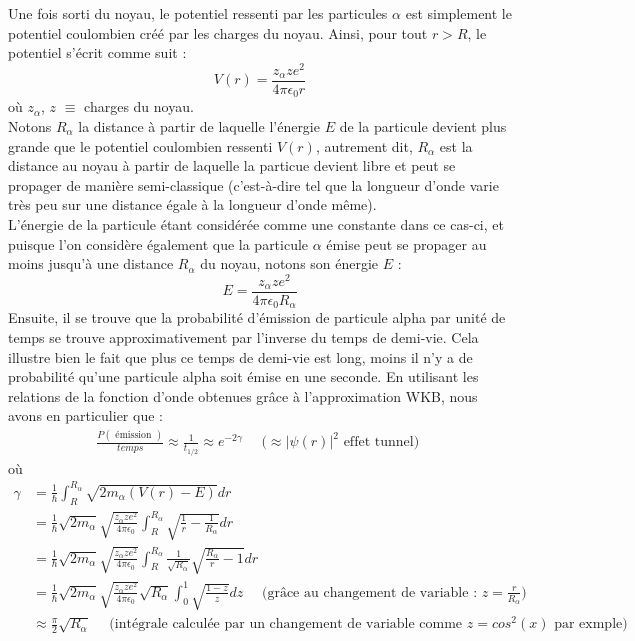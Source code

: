 \documentclass[12pt, a4paper]{book}
\begin{document}
Une fois sorti du noyau, le potentiel ressenti par les particules $\alpha$ est simplement le potentiel coulombien créé par les charges du noyau. Ainsi, pour tout $r > R$, le potentiel s'écrit comme suit :
\begin{equation}
  V(r) = \frac{z_{\alpha} z e^2}{4 \pi \epsilon_0 r} %
\end{equation}
où $z_{\alpha}$, $z$ $\equiv$ charges du noyau. \\

Notons $R_{\alpha}$ la distance à partir de laquelle l'énergie $E$ de la particule devient plus grande que le potentiel coulombien ressenti $V(r)$, autrement dit, $R_{\alpha}$ est la distance au noyau à partir de laquelle la particue devient libre et peut se propager de manière semi-classique (c'est-à-dire tel que la longueur d'onde varie très peu sur une distance égale à la longueur d'onde même). \\
L'énergie de la particule étant considérée comme une constante dans ce cas-ci, et puisque l'on considère également que la particule $\alpha$ émise peut se propager au moins jusqu'à une distance $R_{\alpha}$ du noyau, notons son énergie $E$ : $$ E= \frac{z_{\alpha}z e^2}{4 \pi \epsilon_0 R_{\alpha}}$$ 
Ensuite, il se trouve que la probabilité d'émission de particule alpha par unité de temps se trouve approximativement par l'inverse du temps de demi-vie. Cela illustre bien le fait que plus ce temps de demi-vie est long, moins il n'y a de probabilité qu'une particule alpha soit émise en une seconde. En utilisant les relations de la fonction d'onde obtenues grâce à l'approximation WKB,
nous avons en particulier que : 
\begin{align}
  \frac{P( \mbox{ émission } )}{temps} \approx \frac{1}{t_{1/2}} \approx e^{-2 \gamma} \quad \mbox{ ($\approx \lvert \psi (r) \rvert ^2$ effet tunnel) } 
\end{align}
où  \begin{align*}
  \gamma &= \frac{1}{\hbar} \int_R^{R_{\alpha}} \sqrt{2 m_{\alpha} (V(r) - E)} dr \\
  &= \frac{1}{\hbar} \sqrt{2 m_{\alpha}} \sqrt{\frac{z_{\alpha} z e^2}{4 \pi \epsilon_0}} \int_R^{R_{\alpha}} \sqrt{\frac{1}{r} - \frac{1}{R_{\alpha}}} dr \\
  &= \frac{1}{\hbar} \sqrt{2 m_{\alpha}} \sqrt{\frac{z_{\alpha} z e^2}{4 \pi \epsilon_0}} \int_R^{R_{\alpha}} \frac{1}{\sqrt{R_{\alpha}}} \sqrt{\frac{R_{\alpha}}{r} - 1} dr \\
  &= \frac{1}{\hbar} \sqrt{2 m_{\alpha}} \sqrt{\frac{z_{\alpha} z e^2}{4 \pi \epsilon_0}} \sqrt{R_{\alpha}} \int_0^1 \sqrt{\frac{1-z}{z}} dz \quad \mbox{ (grâce au changement de variable : $z = \frac{r}{R_{\alpha}}$)} \\
  &\approx \frac{\pi}{2} \sqrt{R_{\alpha}} \quad \mbox{ (intégrale calculée par un changement de variable comme $z = cos^2(x)$ par exmple)} 
\end{align*}
\end{document}
